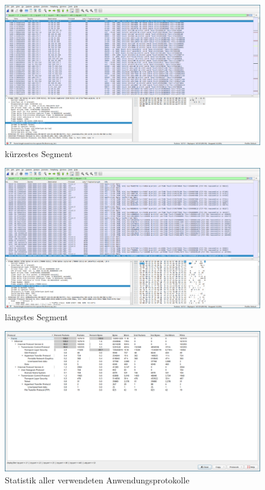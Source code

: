 \FloatBarrier

\begin{figure}[p]
    \centering
    \includegraphics[width=1\textwidth]{./assets/5.1.b.1.png}
    \caption{kürzestes Segment}
    \label{fig:5.1.b.1}
\end{figure}

\begin{figure}[p]
    \centering
    \includegraphics[width=1\textwidth]{./assets/5.1.b.2.png}
    \caption{längstes Segment}
    \label{fig:5.1.b.2}
\end{figure}

\FloatBarrier

\begin{figure}[p]
    \centering
    \includegraphics[width=1\textwidth]{./assets/5.1.c.png}
    \caption{Statistik aller verwendeten Anwendungsprotokolle}
    \label{fig:5.1.c}
\end{figure}
